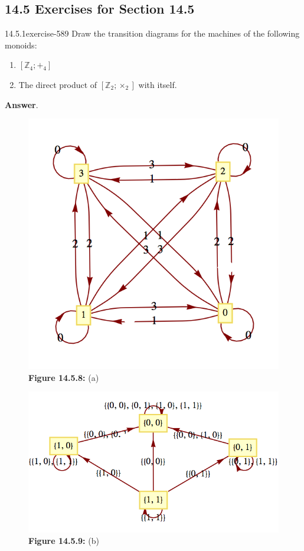 \documentclass[twoside,10pt,]{book}
\numberwithin{equation}{section}
\begin{document}
\subsection*{14.5 Exercises for Section 14.5}
\begin{divisionsolution}{14.5.1}{}{exercise-589}%
\hypertarget{p-5282}{}%
Draw the transition diagrams for the machines of the following monoids:\leavevmode%
\begin{enumerate}[label=(\alph*)]
\item\hypertarget{li-2389}{}\hypertarget{p-5283}{}%
\(\left[\mathbb{Z}_4;+_4\right]\)%
\item\hypertarget{li-2390}{}\hypertarget{p-5284}{}%
The direct product of  \(\left[\mathbb{Z}_2;\times _2\right]\) with itself.%
\end{enumerate}
%
\par\smallskip%
\noindent\textbf{Answer}.\quad%
\leavevmode%
\begin{figure}
\centering
\includegraphics[width=0.7\linewidth]{images/fig-sol-14-5-1a.png}
\caption*{\textbf{Figure 14.5.8:} (a)}
\end{figure}
\begin{figure}
\centering
\includegraphics[width=0.7\linewidth]{images/fig-sol-14-5-1b.png}
\caption*{\textbf{Figure 14.5.9:} (b)}
\end{figure}
\end{divisionsolution}%
\end{document}
